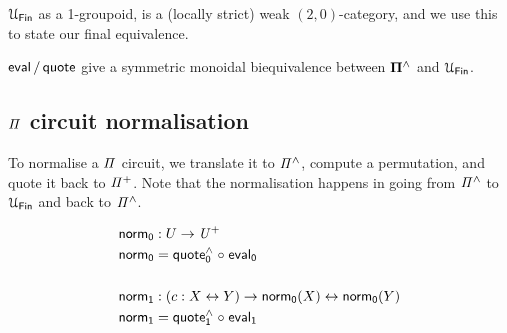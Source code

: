 $\UFin$ as a 1-groupoid, is a (locally strict) weak $(2,0)$-category, and we use this to state our final equivalence.

\begin{proposition}
  $\evalt/\quotet$ give a symmetric monoidal biequivalence between $\mathbf{\Pi^{\wedge}}$ and $\UFin$.
\end{proposition}

\subsection{$\mathit{\Pi}$ circuit normalisation}

To normalise a $\mathit{\Pi}$ circuit, we translate it to $\mathit{{\Pi}^{\wedge}}$, compute a permutation, and quote it back to
$\mathit{{\Pi}^{+}}$. Note that the normalisation happens in going from $\mathit{{\Pi}^{\wedge}}$ to $\UFin$ and back to $\mathit{{\Pi}^{\wedge}}$.

\begin{definition}
  \begin{align*}
    \normt_{0} & : U \to \UPlus                                        \\
    \normt_{0} & = \quoteh_{0} \comp \evalt_{0}                        \\
    \\
    \normt_{1} & : (c : X \iso Y) \to \normt_{0}(X) \iso \normt_{0}(Y) \\
    \normt_{1} & = \quoteh_{1} \comp \evalt_{1}                        \\
  \end{align*}
\end{definition}


